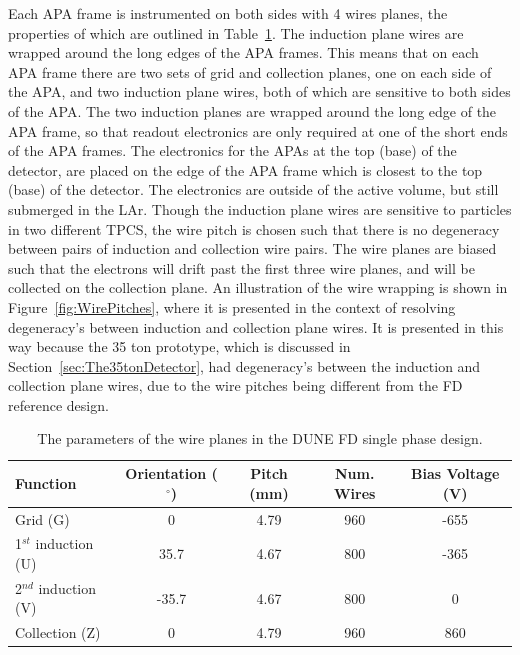 Each APA frame is instrumented on both sides with 4 wires planes, the properties of which are outlined in Table~\ref{tab:DUNE_SP_WP}. The induction plane wires are wrapped around the long edges of the APA frames. This means that on each APA frame there are two sets of grid and collection planes, one on each side of the APA, and two induction plane wires, both of which are sensitive to both sides of the APA. The two induction planes are wrapped around the long edge of the APA frame, so that readout electronics are only required at one of the short ends of the APA frames. The electronics for the APAs at the top (base) of the detector, are placed on the edge of the APA frame which is closest to the top (base) of the detector. The electronics are outside of the active volume, but still submerged in the LAr. Though the induction plane wires are sensitive to particles in two different TPCS, the wire pitch is chosen such that there is no degeneracy between pairs of induction and collection wire pairs. The wire planes are biased such that the electrons will drift past the first three wire planes, and will be collected on the collection plane. An illustration of the wire wrapping is shown in Figure~\ref{fig:WirePitches}, where it is presented in the context of resolving degeneracy's between induction and collection plane wires. It is presented in this way because the 35 ton prototype, which is discussed in Section~\ref{sec:The35tonDetector}, had degeneracy's between the induction and collection plane wires, due to the wire pitches being different from the FD reference design. \\

\begin{table}
  \caption[The parameters of the wire planes in the DUNE FD single phase design]
          {The parameters of the wire planes in the DUNE FD single phase design.}
  \label{tab:DUNE_SP_WP}
  \centering
  \begin{tabular}{l c c c c}
    \toprule
    {Function}             & {Orientation ($^{\circ}$)} & {Pitch (mm)} & Num. Wires & Bias Voltage (V) \\ 
    \midrule
    Grid (G)               & 0                          & 4.79         & 960        & -655 \\
    
    1$^{st}$ induction (U) & 35.7                       & 4.67         & 800        & -365 \\
    
    2$^{nd}$ induction (V) & -35.7                      & 4.67         & 800        & 0    \\
    
    Collection (Z)         & 0                          & 4.79         & 960        & 860 \\
    \bottomrule
  \end{tabular}
\end{table}

